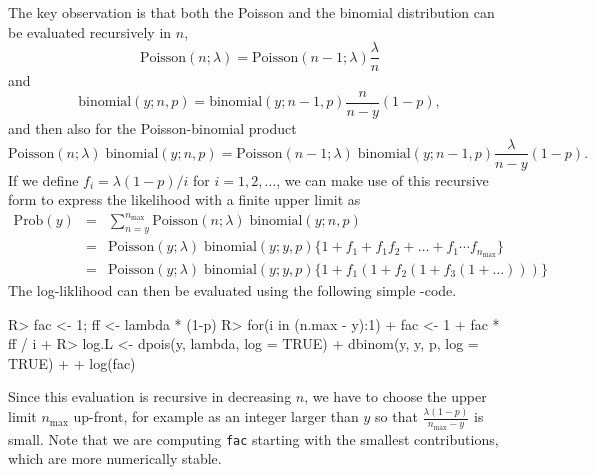 \documentclass[article]{jss}
\begin{document}
The key observation is that both the Poisson and the binomial distribution can be evaluated recursively in $n$,
\begin{displaymath}
    \text{Poisson}(n; \lambda) = \text{Poisson}(n-1; \lambda) \frac{\lambda}{n}
\end{displaymath}
and
\begin{displaymath}
    \text{binomial}(y; n, p) = \text{binomial}(y; n-1, p) \frac{n}{n-y}(1-p),
\end{displaymath}
and then also for the Poisson-binomial product
\begin{displaymath}
    \text{Poisson}(n ; \lambda) \; \text{binomial}(y;  n, p)
    =
    \text{Poisson}(n-1; \lambda) \; \text{binomial}(y; n-1, p)
    \frac{\lambda}{n-y}(1-p).
\end{displaymath}
If we define $f_i = \lambda(1-p)/i$ for $i=1, 2, \ldots$, we can make use of this recursive form to express the likelihood with a finite upper limit as
\begin{eqnarray}
    \text{Prob}(y) &=& \sum_{n = y}^{n_{\text{max}}}
                       \text{Poisson}(n ; \lambda)\;
                      \text{binomial}(y;  n, p) \nonumber\\
                   &=& \text{Poisson}(y; \lambda)\; \text{binomial}(y; y, p)
                       \Big\{ 1 + f_1 + f_1f_2 +
                    \ldots
                      +f_1\cdots f_{n_\text{max}}
                       \Big\} \nonumber\\
                   &=& \text{Poisson}(y; \lambda)\; \text{binomial}(y; y, p)
                       \Big\{ 1 + f_1(1+f_2(1+f_3(1+ \dots)))\Big\}\nonumber
\end{eqnarray}
The log-liklihood can then be evaluated using the following simple -code.
\begin{Code}
R> fac <- 1; ff <- lambda * (1-p)
R> for(i in (n.max - y):1){
+    fac <- 1 + fac * ff / i
+  } 
R> log.L <- dpois(y, lambda, log = TRUE) + dbinom(y, y, p, log = TRUE) + 
+           log(fac)
\end{Code}
Since this evaluation is recursive in decreasing $n$, we have to choose the upper limit $n_\text{max}$ up-front, for example as an integer larger than $y$ so that $\frac{\lambda (1-p)}{n_\text{max}-y}$ is small. Note that we are computing \texttt{fac} starting with the smallest contributions, which are more numerically stable.
\end{document}
